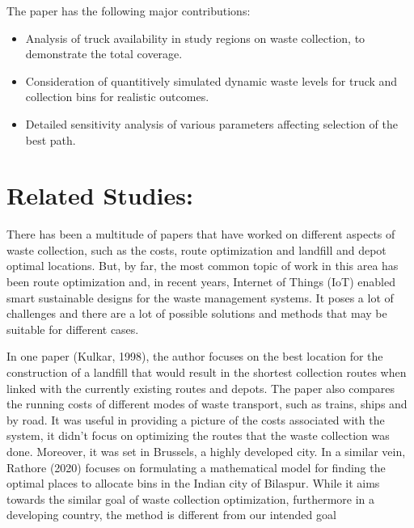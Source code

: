 \documentclass[12pt]{article}
\begin{document}
The paper has the following major contributions:
\begin{itemize}
\item Analysis of truck availability in study regions on waste collection, to demonstrate the total coverage.
\item Consideration of quantitively simulated dynamic waste levels for truck and
collection bins for realistic outcomes.
\item Detailed sensitivity analysis of various parameters affecting selection of the best path.
\end{itemize}

\section{Related Studies:}

There has been a multitude of papers that have worked on different aspects of waste collection, such as the costs, route optimization and landfill and depot optimal locations. But, by far, the most common topic of work in this area has been route optimization and, in recent years, Internet of Things (IoT) enabled smart sustainable designs for the waste management systems. It poses a lot of challenges and there are a lot of possible solutions and methods that may be suitable for different cases. 

In one paper (Kulkar, 1998), the author focuses on the best location for the construction of a landfill that would result in the shortest collection routes when linked with the currently existing routes and depots. The paper also compares the running costs of different modes of waste transport, such as trains, ships and by road. It was useful in providing a picture of the costs associated with the system, it didn't focus on optimizing the routes that the waste collection was done. Moreover, it was set in Brussels, a highly developed city. In a similar vein, Rathore (2020) focuses on formulating a mathematical model for finding the optimal places to allocate bins in the Indian city of Bilaspur. While it aims towards the similar goal of waste collection optimization, furthermore in a developing country, the method is different from our intended goal
\end{document}
